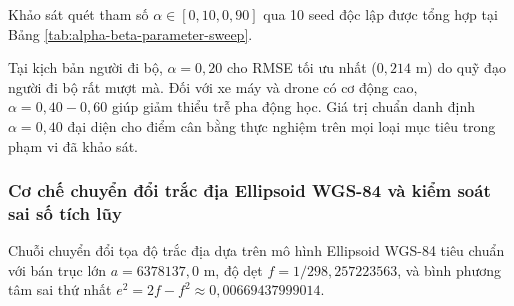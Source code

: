 Khảo sát quét tham số $\alpha \in [0{,}10, 0{,}90]$ qua 10 seed độc lập được tổng hợp tại Bảng \ref{tab:alpha-beta-parameter-sweep}.

\begin{table}[H]
\centering
\caption{Đánh giá độ nhạy RMSE và thời gian hội tụ theo tham số bộ lọc Alpha-Beta}
\label{tab:alpha-beta-parameter-sweep}
\end{table}

Tại kịch bản người đi bộ, $\alpha = 0{,}20$ cho RMSE tối ưu nhất ($0{,}214$ m) do quỹ đạo người đi bộ rất mượt mà. Đối với xe máy và drone có cơ động cao, $\alpha = 0{,}40 - 0{,}60$ giúp giảm thiểu trễ pha động học. Giá trị chuẩn danh định $\alpha = 0{,}40$ đại diện cho điểm cân bằng thực nghiệm trên mọi loại mục tiêu trong phạm vi đã khảo sát.

\subsubsection{Cơ chế chuyển đổi trắc địa Ellipsoid WGS-84 và kiểm soát sai số tích lũy}

\hspace{0.5cm} Chuỗi chuyển đổi tọa độ trắc địa dựa trên mô hình Ellipsoid WGS-84 tiêu chuẩn với bán trục lớn $a = 6378137{,}0$ m, độ dẹt $f = 1/298{,}257223563$, và bình phương tâm sai thứ nhất $e^2 = 2f - f^2 \approx 0{,}00669437999014$.

